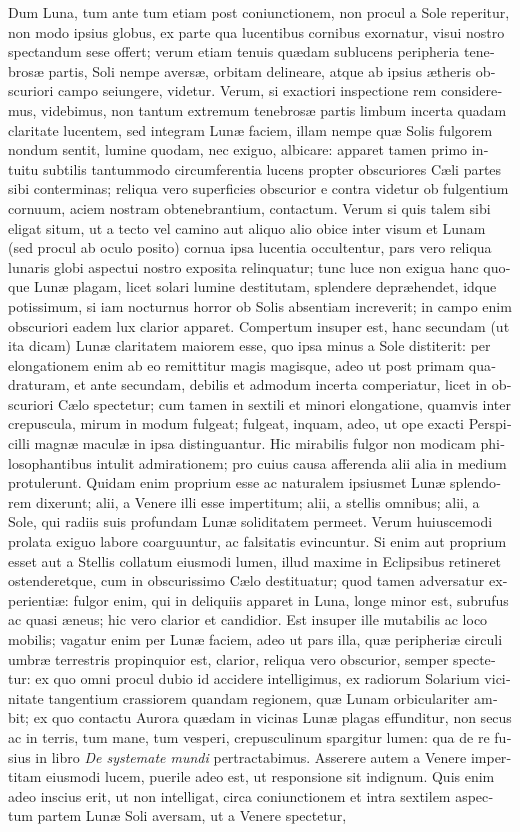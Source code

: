 \documentclass[11pt,twoside,openany]{book}
\begin{document}
\begin{otherlanguage}{latin}
Dum Luna, tum ante tum etiam post coniunctionem, non procul a Sole reperitur, non modo ipsius globus, ex parte qua lucentibus cornibus exornatur, visui nostro spectandum sese offert; verum etiam tenuis quædam sublucens peripheria tenebrosæ partis, Soli nempe aversæ, orbitam delineare, atque ab ipsius ætheris obscuriori campo seiungere, videtur. Verum, si exactiori inspectione rem consideremus, videbimus, non tantum extremum tenebrosæ partis limbum incerta quadam claritate lucentem, sed integram Lunæ faciem, illam nempe quæ Solis fulgorem nondum sentit, lumine quodam, nec exiguo, albicare: apparet tamen primo intuitu subtilis tantummodo circumferentia lucens propter obscuriores Cæli partes sibi conterminas; reliqua vero superficies obscurior e contra videtur ob fulgentium cornuum, aciem nostram obtenebrantium, contactum. Verum si quis talem sibi eligat situm, ut a tecto vel camino aut aliquo alio obice inter visum et Lunam (sed procul ab oculo posito) cornua ipsa lucentia occultentur, pars vero reliqua lunaris globi aspectui nostro exposita relinquatur; tunc luce non exigua hanc quoque Lunæ plagam, licet solari lumine destitutam, splendere depræhendet, idque potissimum, si iam nocturnus horror ob Solis absentiam increverit; in campo enim obscuriori eadem lux clarior apparet. Compertum insuper est, hanc secundam (ut ita dicam) Lunæ claritatem maiorem esse, quo ipsa minus a Sole distiterit: per elongationem enim ab eo remittitur magis magisque, adeo ut post primam quadraturam, et ante secundam, debilis et admodum incerta comperiatur, licet in obscuriori Cælo spectetur; cum tamen in sextili et minori elongatione, quamvis inter crepuscula, mirum in modum fulgeat; fulgeat, inquam, adeo, ut ope exacti Perspicilli magnæ maculæ in ipsa distinguantur. Hic mirabilis fulgor non modicam philosophantibus intulit admirationem; pro cuius causa afferenda alii alia in medium protulerunt. Quidam enim proprium esse ac naturalem ipsiusmet Lunæ splendorem dixerunt; alii, a Venere illi esse impertitum; alii, a stellis omnibus; alii, a Sole, qui radiis suis profundam Lunæ soliditatem permeet. Verum huiuscemodi prolata exiguo labore coarguuntur, ac falsitatis evincuntur. Si enim aut proprium esset aut a Stellis collatum eiusmodi lumen, illud maxime in Eclipsibus retineret ostenderetque, cum in obscurissimo Cælo destituatur; quod tamen adversatur experientiæ: fulgor enim, qui in deliquiis apparet in Luna, longe minor est, subrufus ac quasi æneus; hic vero clarior et candidior. Est insuper ille mutabilis ac loco mobilis; vagatur enim per Lunæ faciem, adeo ut pars illa, quæ peripheriæ circuli umbræ terrestris propinquior est, clarior, reliqua vero obscurior, semper spectetur: ex quo omni procul dubio id accidere intelligimus, ex radiorum Solarium vicinitate tangentium crassiorem quandam regionem, quæ Lunam orbiculariter ambit; ex quo contactu Aurora quædam in vicinas Lunæ plagas effunditur, non secus ac in terris, tum mane, tum vesperi, crepusculinum spargitur lumen: qua de re fusius in libro \textit{De systemate mundi} pertractabimus. Asserere autem a Venere impertitam eiusmodi lucem, puerile adeo est, ut responsione sit indignum. Quis enim adeo inscius erit, ut non intelligat, circa coniunctionem et intra sextilem aspectum partem Lunæ Soli aversam, ut a Venere spectetur, 
\end{otherlanguage}
\end{document}
